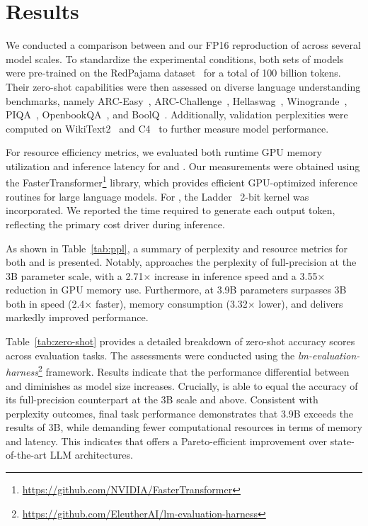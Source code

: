 \section{Results}

We conducted a comparison between  and our FP16 reproduction of  across several model scales. To standardize the experimental conditions, both sets of models were pre-trained on the RedPajama dataset~\cite{redpajama} for a total of 100 billion tokens. Their zero-shot capabilities were then assessed on diverse language understanding benchmarks, namely ARC-Easy~\cite{arc}, ARC-Challenge~\cite{arc}, Hellaswag~\cite{hellaswag}, Winogrande~\cite{winoGrande}, PIQA~\cite{piqa}, OpenbookQA~\cite{openbookqa}, and BoolQ~\cite{boolq}. Additionally, validation perplexities were computed on WikiText2~\cite{wikitext2} and C4~\cite{c4} to further measure model performance.

For resource efficiency metrics, we evaluated both runtime GPU memory utilization and inference latency for  and . Our measurements were obtained using the FasterTransformer\footnote{\url{https://github.com/NVIDIA/FasterTransformer}} library, which provides efficient GPU-optimized inference routines for large language models. For , the Ladder~\cite{ladder} 2-bit kernel was incorporated. We reported the time required to generate each output token, reflecting the primary cost driver during inference.

As shown in Table~\ref{tab:ppl}, a summary of perplexity and resource metrics for both  and  is presented. Notably,  approaches the perplexity of full-precision  at the 3B parameter scale, with a 2.71$\times$ increase in inference speed and a 3.55$\times$ reduction in GPU memory use. Furthermore,  at 3.9B parameters surpasses  3B both in speed (2.4$\times$ faster), memory consumption (3.32$\times$ lower), and delivers markedly improved performance.

Table~\ref{tab:zero-shot} provides a detailed breakdown of zero-shot accuracy scores across evaluation tasks. The assessments were conducted using the \emph{lm-evaluation-harness}\footnote{\url{https://github.com/EleutherAI/lm-evaluation-harness}} framework. Results indicate that the performance differential between  and  diminishes as model size increases. Crucially,  is able to equal the accuracy of its full-precision counterpart at the 3B scale and above. Consistent with perplexity outcomes, final task performance demonstrates that  3.9B exceeds the results of  3B, while demanding fewer computational resources in terms of memory and latency. This indicates that  offers a Pareto-efficient improvement over state-of-the-art LLM architectures.

